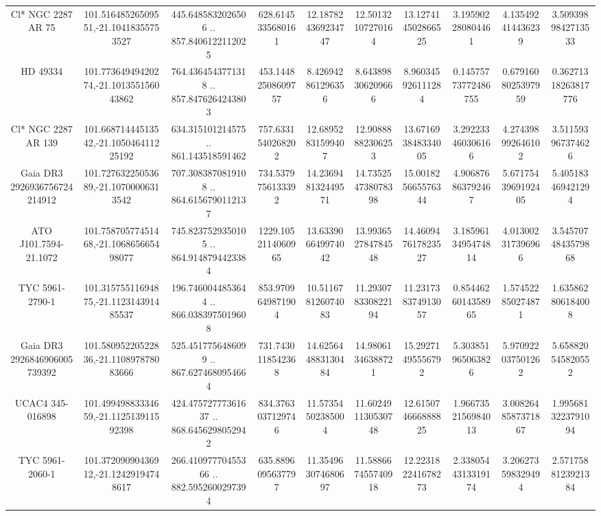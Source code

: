 \begin{table}
\begin{tabular}{cccccccccc}
Cl* NGC 2287     AR      75 & 101.51648526509551,-21.10418355753527 & 445.6485832026506 .. 857.8406122112025 & 628.6145335680161 & 12.187824369234747 & 12.50132107270164 & 13.127414502866525 & 3.195902280804461 & 4.135492414436239 & 3.5093989842713533 \\
HD  49334 & 101.77364949420274,-21.101355156043862 & 764.4364543771318 .. 857.8476264243803 & 453.14482508609757 & 8.426942861296356 & 8.643898306209666 & 8.960345926111284 & 0.14575773772486755 & 0.6791608025397959 & 0.36271318263817776 \\
Cl* NGC 2287     AR     139 & 101.66871444513542,-21.105046411225192 & 634.315101214575 .. 861.143518591462 & 757.6331540268202 & 12.68952831599407 & 12.90888882306253 & 13.671693848334005 & 3.292233460306166 & 4.274398992646102 & 3.511593967374626 \\
Gaia DR3 2926936756724214912 & 101.72763225053689,-21.10700006313542 & 707.3083870819108 .. 864.6156790112137 & 734.5379756133392 & 14.236948132449571 & 14.735254738078398 & 15.001825665576344 & 4.906876863792467 & 5.6717543969192405 & 5.405183469421294 \\
ATO J101.7594-21.1072 & 101.75870577451468,-21.106865665498077 & 745.8237529350105 .. 864.9148794423384 & 1229.1052114060965 & 13.633906649974042 & 13.993652784784548 & 14.460947617823527 & 3.1859613495474814 & 4.013002317396966 & 3.5457074843579868 \\
TYC 5961-2790-1 & 101.31575511694875,-21.112314391485537 & 196.7460044853644 .. 866.0383975019608 & 853.9709649871904 & 10.511678126074083 & 11.293078330822194 & 11.231738374913057 & 0.8544626014358965 & 1.574522850274871 & 1.635862806184008 \\
Gaia DR3 2926846906005739392 & 101.58095220522836,-21.110897878083666 & 525.4517756486099 .. 867.6274680954664 & 731.7430118542368 & 14.625644883130484 & 14.98061346388721 & 15.29271495556792 & 5.303851965063826 & 5.970922037501262 & 5.658820545820552 \\
UCAC4 345-016898 & 101.49949883334659,-21.112513911592398 & 424.47572777361637 .. 868.6456298052942 & 834.3763037129746 & 11.57354502385004 & 11.602491130530748 & 12.615074666888825 & 1.9667352156984013 & 3.0082648587371867 & 1.9956813223791094 \\
TYC 5961-2060-1 & 101.37209090436912,-21.12429194748617 & 266.41097770455366 .. 882.5952600297394 & 635.8896095637797 & 11.354963074680697 & 11.588667455740918 & 12.223182241678273 & 2.3380544313319174 & 3.206273598329494 & 2.5717588123921384 \\

\end{tabular}
\end{table}
